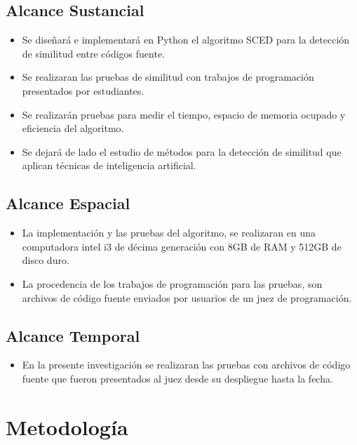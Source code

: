 \subsection{Alcance Sustancial}
\begin{itemize}
    \item Se diseñará e implementará en Python el algoritmo SCED para la detección de similitud entre códigos fuente.
    \item Se realizaran las pruebas de similitud con trabajos de programación presentados por estudiantes.
    \item Se realizarán pruebas para medir el tiempo, espacio de memoria ocupado y eficiencia del algoritmo.
    \item Se dejará de lado el estudio de métodos para la detección de similitud que aplican técnicas de inteligencia artificial.
\end{itemize}
\subsection{Alcance Espacial}
\begin{itemize}
  \item La implementación y las pruebas del algoritmo, se realizaran en una computadora intel i3 de décima generación con 8GB de RAM y 512GB de disco duro.
  \item La procedencia de los trabajos de programación para las pruebas, son archivos de código fuente enviados por usuarios de un juez de programación.
\end{itemize}
\subsection{Alcance Temporal}
\begin{itemize}
  \item En la presente investigación se realizaran las pruebas con archivos de código fuente que fueron presentados al juez desde su despliegue hasta la fecha.
\end{itemize}
\section{Metodología}
